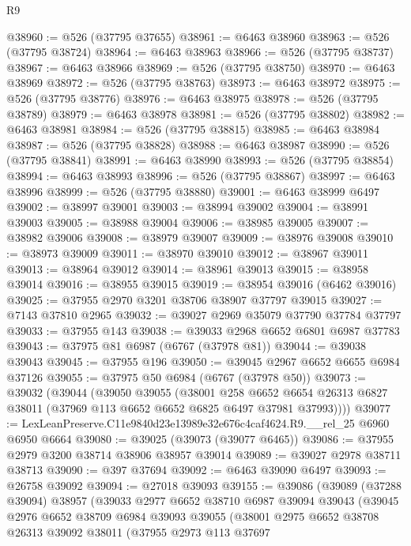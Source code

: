 \begin{lexlean}{R9}
\begin{coremodule}
@38960 := @526 (@37795 @37655)
@38961 := @6463 @38960
@38963 := @526 (@37795 @38724)
@38964 := @6463 @38963
@38966 := @526 (@37795 @38737)
@38967 := @6463 @38966
@38969 := @526 (@37795 @38750)
@38970 := @6463 @38969
@38972 := @526 (@37795 @38763)
@38973 := @6463 @38972
@38975 := @526 (@37795 @38776)
@38976 := @6463 @38975
@38978 := @526 (@37795 @38789)
@38979 := @6463 @38978
@38981 := @526 (@37795 @38802)
@38982 := @6463 @38981
@38984 := @526 (@37795 @38815)
@38985 := @6463 @38984
@38987 := @526 (@37795 @38828)
@38988 := @6463 @38987
@38990 := @526 (@37795 @38841)
@38991 := @6463 @38990
@38993 := @526 (@37795 @38854)
@38994 := @6463 @38993
@38996 := @526 (@37795 @38867)
@38997 := @6463 @38996
@38999 := @526 (@37795 @38880)
@39001 := @6463 @38999 @6497
@39002 := @38997 @39001
@39003 := @38994 @39002
@39004 := @38991 @39003
@39005 := @38988 @39004
@39006 := @38985 @39005
@39007 := @38982 @39006
@39008 := @38979 @39007
@39009 := @38976 @39008
@39010 := @38973 @39009
@39011 := @38970 @39010
@39012 := @38967 @39011
@39013 := @38964 @39012
@39014 := @38961 @39013
@39015 := @38958 @39014
@39016 := @38955 @39015
@39019 := @38954 @39016 (@6462 @39016)
@39025 := @37955 @2970 @3201 @38706 @38907 @37797 @39015
@39027 := @7143 @37810 @2965
@39032 := @39027 @2969 @35079 @37790 @37784 @37797
@39033 := @37955 @143
@39038 := @39033 @2968 @6652 @6801 @6987 @37783
@39043 := @37975 @81 @6987 (@6767 (@37978 @81))
@39044 := @39038 @39043
@39045 := @37955 @196
@39050 := @39045 @2967 @6652 @6655 @6984 @37126
@39055 := @37975 @50 @6984 (@6767 (@37978 @50))
@39073 := @39032
    (@39044
      (@39050
        @39055
        (@38001
          @258
          @6652
          @6654
          @26313
          @6827
          @38011
          (@37969 @113 @6652 @6652 @6825 @6497 @37981 @37993))))
@39077 := LexLeanPreserve.C11e9840d23e13989e32e676c4caf4624.R9.__rel_25 @6960 @6950 @6664
@39080 := @39025 (@39073 (@39077 @6465))
@39086 := @37955 @2979 @3200 @38714 @38906 @38957 @39014
@39089 := @39027 @2978 @38711 @38713
@39090 := @397 @37694
@39092 := @6463 @39090 @6497
@39093 := @26758 @39092
@39094 := @27018 @39093
@39155 := @39086
    (@39089
      (@37288 @39094)
      @38957
      (@39033
        @2977
        @6652
        @38710
        @6987
        @39094
        @39043
        (@39045
          @2976
          @6652
          @38709
          @6984
          @39093
          @39055
          (@38001
            @2975
            @6652
            @38708
            @26313
            @39092
            @38011
            (@37955
              @2973
              @113
              @37697

\end{coremodule}
\end{lexlean}

